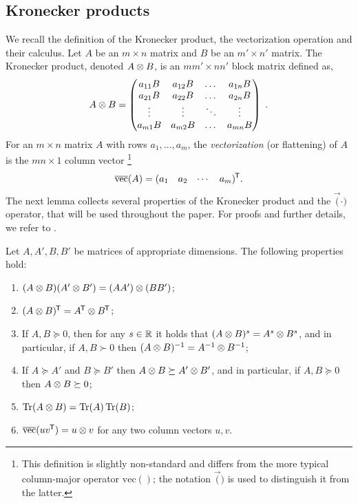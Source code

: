 \subsection{Kronecker products}
\label{sec:kron}

We recall the definition of the Kronecker product, the vectorization operation and their calculus.
Let $A$ be an $m \times n$ matrix and $B$ be an $m' \times n'$ matrix.
The Kronecker product, denoted $A \otimes B$, is an $mm' \times nn'$ block
matrix defined as,
\begin{align*}
A \otimes B =
\begin{pmatrix}
    a_{11} B	& a_{12} B 	& \dots 	& a_{1n} B \\
    a_{21} B	& a_{22} B 	& \dots 	& a_{2n} B \\
    \vdots		& \vdots	& \ddots	& \vdots   \\
    a_{m1} B	& a_{m2} B 	& \dots 	& a_{mn} B \\
\end{pmatrix}
~ .
\end{align*}
For an $m \times n$ matrix $A$ with rows $a_1,\ldots,a_m$, the \emph{vectorization} (or flattening)
of $A$ is the $mn \times 1$ column vector%
\footnote{This definition is slightly non-standard and differs from the more typical column-major operator $\mathrm{vec}()$; the notation $\vec()$
is used to distinguish it from the latter.}
$$\overline{\mathrm{vec}}(A) = (\begin{matrix} a_1 & a_2 & \cdots & a_m \end{matrix})^{\mkern-1.5mu\scriptstyle\mathsf{T}}.$$
%
The next lemma collects several properties of the Kronecker product and the $\vec(\cdot)$ operator, that will be used throughout the paper.
For proofs and further details, we refer to \cite{horn1991topics}.
%

\begin{lemma} \label{lem:kron-props}
Let $A,A',B,B'$ be matrices of appropriate dimensions.
The following properties hold:
\begin{enumerate}[label=(\roman*)]
\item \label{it:kron-prod}
$(A \otimes B)(A' \otimes B') = (A A') \otimes (B B')$;
\item
$(A \otimes B)^{\mkern-1.5mu\scriptstyle\mathsf{T}} = A^{\mkern-1.5mu\scriptstyle\mathsf{T}} \otimes B^{\mkern-1.5mu\scriptstyle\mathsf{T}}$;
\item \label{it:kron-pow}
If $A,B \succeq 0$, then for any $s \in \mathbb{R}$ it holds that $(A \otimes B)^s = A^s \otimes B^s$, and in particular, if $A,B \succ 0$ then $(A \otimes B)^{-1} = A^{-1} \otimes B^{-1}$;
\item \label{it:kron-monotone}
If $A \succeq A'$ and $B \succeq B'$ then $A \otimes B \succeq A' \otimes B'$,
and in particular, if $A,B \succeq 0$ then $A \otimes B \succeq 0$;
\item 
$\operatorname*{Tr}(A \otimes B) = \operatorname*{Tr}(A) \operatorname*{Tr}(B)$;
\item \label{it:vec-kron}
$\overline{\mathrm{vec}}(uv^{\mkern-1.5mu\scriptstyle\mathsf{T}}) = u \otimes v$ for any two column vectors $u,v$.
\end{enumerate}
\end{lemma}

